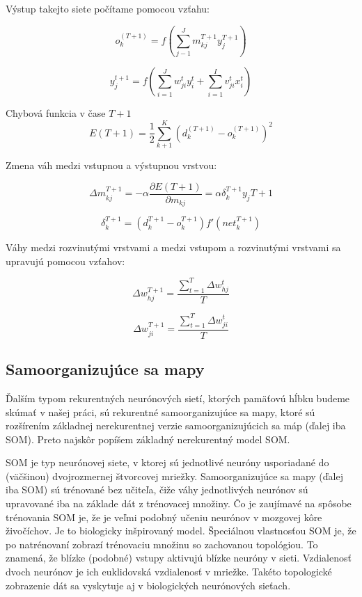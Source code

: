 Výstup takejto siete počítame pomocou vzťahu:

\begin{equation}
	o_{k}^{(T+1)} = f(\sum_{j-1}^{J}m_{kj}^{T+1}y_{j}^{T+1})
\end{equation}

\begin{equation}
	y_{j}^{t+1} = f (\sum_{i=1}^{J}w_{ji}^{t}y_{i}^{t} + \sum_{i=1}^{I}v_{ji}^{t}x_{i}^{t})
\end{equation}

Chybová funkcia  v čase $T + 1$
\begin{equation}
	E(T+1) = \frac{1}{2} \sum_{k+1}^{K}(d_{k}^{(T+1)} - o_{k}^{(T+1)})^{2}
\end{equation}

Zmena váh medzi vstupnou a výstupnou vrstvou:

\begin{equation}
	\Delta m_{kj}^{T+1} = -\alpha\frac{\partial E(T+1)}{\partial m_{kj}} = \alpha \delta_{k}^{T+1}y_{j}{T+1}
\end{equation}

\begin{equation}
	\delta_{k}^{T+1} = (d_{k}^{T+1} - o_{k}^{T+1})f'(net_{k}^{T+1})
\end{equation}

Váhy medzi rozvinutými vrstvami a medzi vstupom a rozvinutými vrstvami sa upravujú pomocou vzťahov:

\begin{equation}
	\Delta w_{hj}^{T+1} = \frac{\sum_{t=1}^{T} \Delta w_{hj}^{t}}{T}
\end{equation}

\begin{equation}
	\Delta w_{ji}^{T+1} = \frac{\sum_{t=1}^{T} \Delta w_{ji}^{t}}{T}
\end{equation}



\subsection{Samoorganizujúce sa mapy}
Ďalším typom rekurentných neurónových sietí, ktorých pamäťovú hĺbku budeme 
skúmať v našej práci, sú rekurentné samoorganizujúce sa mapy, 
ktoré sú rozšírením základnej nerekurentnej verzie samoorganizujúcich sa máp (ďalej iba SOM). 
Preto najskôr popíšem základný nerekurentný model SOM.

SOM je typ neurónovej siete, v ktorej sú jednotlivé neuróny usporiadané do (väčšinou) dvojrozmernej štvorcovej mriežky. Samoorganizujúce sa mapy (ďalej iba SOM) sú trénované bez učiteľa, čiže váhy jednotlivých neurónov sú upravované iba na základe dát z trénovacej množiny. 
Čo je zaujímavé na spôsobe trénovania SOM je, že je veľmi podobný učeniu neurónov v mozgovej kôre živočíchov. Je to biologicky inšpirovaný model.
Špeciálnou vlastnosťou SOM je, že po natrénovaní zobrazí trénovaciu množinu so zachovanou topológiou. To znamená, že blízke (podobné) vstupy aktivujú blízke neuróny v sieti. Vzdialenosť dvoch neurónov je ich euklidovská vzdialenosť v mriežke. Takéto topologické zobrazenie dát sa vyskytuje aj v biologických neurónových sieťach.

